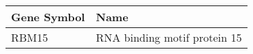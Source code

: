 \begin{tabular}{ll}
\toprule
Gene Symbol &                         Name \\
\midrule
      RBM15 & RNA binding motif protein 15 \\
\bottomrule
\end{tabular}
